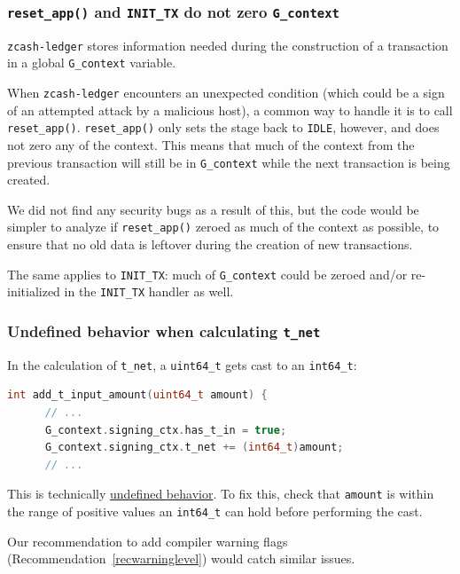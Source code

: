\documentclass[10pt,titlepage]{article}
\begin{document}
\subsubsection{\texttt{reset\_app()} and \texttt{INIT\_TX} do not zero \texttt{G\_context}}

\texttt{zcash-ledger} stores information needed during the construction of a
transaction in a global \texttt{G\_context} variable.

When \texttt{zcash-ledger} encounters an unexpected condition (which could be a
sign of an attempted attack by a malicious host), a common way to handle it is
to call \texttt{reset\_app()}. \texttt{reset\_app()} only sets the stage back to
\texttt{IDLE}, however, and does not zero any of the context. This means that
much of the context from the previous transaction will still be in
\texttt{G\_context} while the next transaction is being created.

We did not find any security bugs as a result of this, but the code would be
simpler to analyze if \texttt{reset\_app()} zeroed as much of the context as
possible, to ensure that no old data is leftover during the creation of new
transactions.

The same applies to \texttt{INIT\_TX}: much of \texttt{G\_context} could be
zeroed and/or re-initialized in the \texttt{INIT\_TX} handler as well.

\subsubsection{Undefined behavior when calculating \texttt{t\_net}}

In the calculation of \texttt{t\_net}, a \texttt{uint64\_t} gets cast to an
\texttt{int64\_t}:

\begin{lstlisting}[language=c]
int add_t_input_amount(uint64_t amount) {
      // ... 
      G_context.signing_ctx.has_t_in = true;
      G_context.signing_ctx.t_net += (int64_t)amount;
      // ...
\end{lstlisting}

This is technically
\href{https://stackoverflow.com/questions/9498190/is-conversion-from-unsigned-to-signed-undefined}{undefined
behavior}. To fix this, check that \texttt{amount} is within the range of
positive values an \texttt{int64\_t} can hold before performing the cast.

Our recommendation to add compiler warning flags
(Recommendation~\ref{recwarninglevel}) would catch similar issues.
\end{document}
